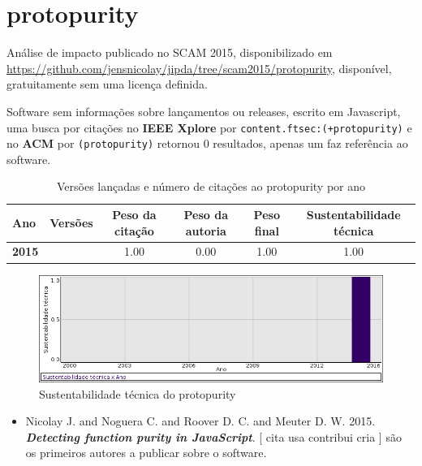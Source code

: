 \section{protopurity}

Análise de impacto
publicado no SCAM 2015,
disponibilizado em \url{https://github.com/jensnicolay/jipda/tree/scam2015/protopurity},
disponível,
gratuitamente
sem uma licença definida.

Software sem informações sobre lançamentos ou releases,
escrito em Javascript,
uma busca por citações no {\bf IEEE Xplore} por
\texttt{content.ftsec:(+protopurity)}
e no {\bf ACM} por
\texttt{(protopurity)}
retornou
0 resultados,
apenas um faz referência ao software.


\begin{table}[H]
\caption{Versões lançadas e número de citações ao protopurity por ano}
\centering
\begin{tabular}{| l | c | c | c | c | c |}
  \hline
  Ano & Versões & Peso da citação & Peso da autoria & Peso final & Sustentabilidade técnica \\
  \hline
            {\bf 2015}
          &
          
          &
          1.00
          &
          0.00
          &
          1.00
          &
            {\color{blue} 1.00}
          \\
\hline
\end{tabular}
\end{table}

\begin{figure}[h]
  \center
  \includegraphics[scale=0.50]{result-documents/charts/protopurity.png}
  \caption{Sustentabilidade técnica do protopurity}
\end{figure}


\begin{itemize}
\item Nicolay J. and Noguera C. and Roover D. C. and Meuter D. W.
      2015.
        \textbf{\textit{ Detecting function purity in JavaScript}}.
      [
          cita
          usa
          contribui
          cria
      ]
são os primeiros autores a publicar sobre o software.
\end{itemize}
